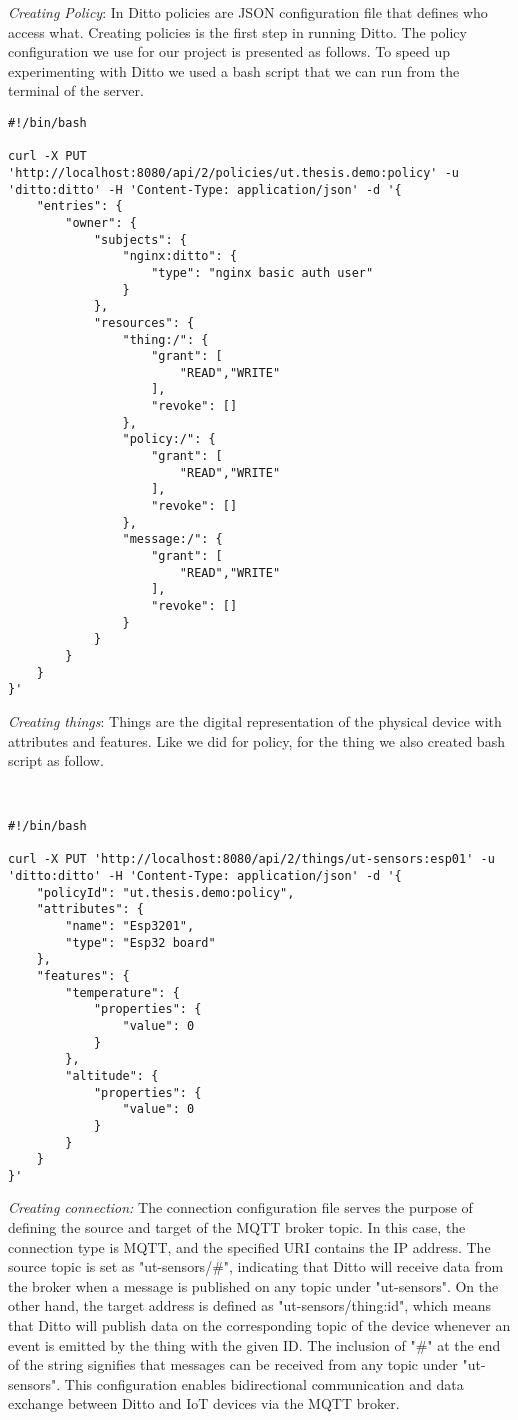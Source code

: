 \textit{Creating Policy}: In Ditto policies are JSON configuration file that defines who access what. Creating policies is the first step in running Ditto. The policy configuration we use for our project is presented as follows. To speed up experimenting with Ditto we used a bash script that we can run from the terminal of the server. 
\begin{lstlisting}[style=CStyle]
#!/bin/bash

curl -X PUT 'http://localhost:8080/api/2/policies/ut.thesis.demo:policy' -u 'ditto:ditto' -H 'Content-Type: application/json' -d '{
    "entries": {
        "owner": {
            "subjects": {
                "nginx:ditto": {
                    "type": "nginx basic auth user"
                }
            },
            "resources": {
                "thing:/": {
                    "grant": [
                        "READ","WRITE"
                    ],
                    "revoke": []
                },
                "policy:/": {
                    "grant": [
                        "READ","WRITE"
                    ],
                    "revoke": []
                },
                "message:/": {
                    "grant": [
                        "READ","WRITE"
                    ],
                    "revoke": []
                }
            }
        }
    }
}'

\end{lstlisting}

\textit{Creating things}: Things are the digital representation of the physical device with attributes and features. Like we did for policy, for the thing we also created bash script as follow. 

\begin{lstlisting}[style=CStyle]
    

#!/bin/bash

curl -X PUT 'http://localhost:8080/api/2/things/ut-sensors:esp01' -u 'ditto:ditto' -H 'Content-Type: application/json' -d '{
    "policyId": "ut.thesis.demo:policy",
    "attributes": {
        "name": "Esp3201",
        "type": "Esp32 board"
    },
    "features": {
        "temperature": {
            "properties": {
                "value": 0
            }
        },
        "altitude": {
            "properties": {
                "value": 0
            }
        }
    }
}'
\end{lstlisting}

\textit{Creating connection:} The connection configuration file serves the purpose of defining the source and target of the MQTT broker topic. In this case, the connection type is MQTT, and the specified URI contains the IP address. The source topic is set as "ut-sensors/\#", indicating that Ditto will receive data from the broker when a message is published on any topic under "ut-sensors". On the other hand, the target address is defined as "ut-sensors/{{thing:id}}", which means that Ditto will publish data on the corresponding topic of the device whenever an event is emitted by the thing with the given ID. The inclusion of "\#" at the end of the string signifies that messages can be received from any topic under "ut-sensors". This configuration enables bidirectional communication and data exchange between Ditto and IoT devices via the MQTT broker. 

